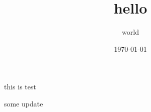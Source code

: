 \documentclass[uplatex]{jsarticle}
\begin{document}
\title{\huge hello}
\author{world}
\date{\today}
\maketitle

this is test

some update
\end{document}
